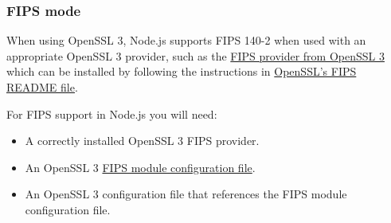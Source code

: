 \begin{Shaded}
\begin{Highlighting}[]
\OperatorTok{=} \NormalTok{(}\OperatorTok{,}\OperatorTok{,}\OperatorTok{,}\NormalTok{ \{}
  \OperatorTok{:} \OperatorTok{,}
\NormalTok{\})}\OperatorTok{;}
\OperatorTok{;}
\OperatorTok{,}\NormalTok{ \{}
  \OperatorTok{:}\OperatorTok{,}
\NormalTok{\})}\OperatorTok{;}
\OperatorTok{=}\OperatorTok{,} \OperatorTok{,} \NormalTok{)}\OperatorTok{;}

\NormalTok{ \{}
\NormalTok{()}\OperatorTok{;}
\NormalTok{\} }
    \NormalTok{(}\OperatorTok{,}\NormalTok{ \{ }\OperatorTok{:}\OperatorTok{;}
\NormalTok{\}}

\OperatorTok{;}
\end{Highlighting}
\end{Shaded}

\subsubsection{FIPS mode}\label{fips-mode}

When using OpenSSL 3, Node.js supports FIPS 140-2 when used with an
appropriate OpenSSL 3 provider, such as the
\href{https://www.openssl.org/docs/man3.0/man7/crypto.html\#FIPS-provider}{FIPS
provider from OpenSSL 3} which can be installed by following the
instructions in
\href{https://github.com/openssl/openssl/blob/openssl-3.0/README-FIPS.md}{OpenSSL's
FIPS README file}.

For FIPS support in Node.js you will need:

\begin{itemize}
\tightlist
\item
  A correctly installed OpenSSL 3 FIPS provider.
\item
  An OpenSSL 3
  \href{https://www.openssl.org/docs/man3.0/man5/fips_config.html}{FIPS
  module configuration file}.
\item
  An OpenSSL 3 configuration file that references the FIPS module
  configuration file.
\end{itemize}

